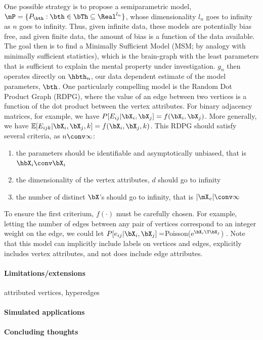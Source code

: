 One possible strategy is to propose a semiparametric model, $\mP=\{P_{\bth} : \bth \in \bTh \subseteq \Real^{l_n}\}$, whose dimensionality $l_n$ goes to infinity as $n$ goes to infinity.  Thus, given infinite data, these models are potentially bias free, and given finite data, the amount of bias is a function of the data available.  The goal then is to find a Minimally Sufficient Model (MSM; by analogy with minimally sufficient statistics), which is the brain-graph with the least parameters that is sufficient to explain the mental property under investigation.  $g_n$ then operates directly on $\hbth_n$, our data dependent estimate of the model parameters, $\bth$.  One particularly compelling model is the Random Dot Product Graph (RDPG), where the value of an edge between two vertices is a function of the dot product between the vertex attributes.  For binary adjacency matrices, for example, we have $P[E_{ij} | \bX_i, \bX_j]=f(\bX_i, \bX_j)$.  More generally, we have $\mathbb{E}[E_{ijk} | \bX_i, \bX_j, k]= f(\bX_i, \bX_j, k)$.  This RDPG should satisfy several criteria, as $n \conv \infty$:

\begin{enumerate}
	\item the parameters should be identifiable and asymptotically unbiased, that is $\hbX_i \conv \bX_i$
	\item the dimensionality of the vertex attributes, $d$ should go to infinity
	\item the number of distinct $\bX$'s should go to infinity, that is $|\mX_v| \conv \infty$
\end{enumerate}

To ensure the first criterium, $f(\cdot)$ must be carefully chosen.  For example, letting the number of edges between any pair of vertices correspond to an integer weight on the edge, we could let $P[e_{ij} | \bX_i,\bX_j]=$Poisson(e$^{\bX_i\T \bX_j}$) \cite{}.   Note that this model can implicitly include labels on vertices and edges, explicitly includes vertex attributes, and not does include edge attributes.  


\paragraph{Limitations/extensions}

attributed vertices, hyperedges

\paragraph{Simulated applications}

\paragraph{Concluding thoughts}





